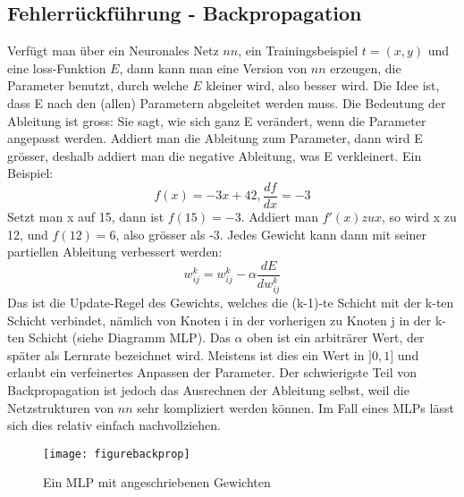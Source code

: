 \documentclass[12pt,a4paper]{article}
\begin{document}
\subsection{Fehlerrückführung - Backpropagation}
Verfügt man über ein Neuronales Netz $nn$, ein Trainingsbeispiel $t = (x,y)$ und eine loss-Funktion $E$, dann kann man eine Version von $nn$ erzeugen, die Parameter benutzt, durch welche $E$ kleiner wird, also besser wird.
Die Idee ist, dass E nach den (allen) Parametern abgeleitet werden muss. Die Bedeutung der Ableitung ist gross: Sie sagt, wie sich ganz E verändert, wenn die Parameter angepasst werden. Addiert man die Ableitung zum Parameter, dann wird E grösser, deshalb addiert man die negative Ableitung, was E verkleinert. Ein Beispiel: 
		$$f(x) = -3x + 42, \frac{df}{dx} = -3$$
Setzt man x auf 15, dann ist $f(15) = -3$. Addiert man $f'(x) zu x$, so wird x zu 12, und $f(12) = 6$, also grösser als -3.
Jedes Gewicht kann dann mit seiner partiellen Ableitung verbessert werden:
	$$w^k_{ij} = w^k_{ij} -  \alpha \frac{dE}{dw^k_{ij}}$$
Das ist die Update-Regel des Gewichts, welches die (k-1)-te Schicht mit der k-ten Schicht verbindet, nämlich von Knoten i in der vorherigen zu Knoten j in der k-ten Schicht (siehe Diagramm MLP). Das $\alpha$ oben ist ein arbiträrer Wert, der später als Lernrate bezeichnet wird. Meistens ist dies ein Wert in $]0,1]$ und erlaubt ein verfeinertes Anpassen der Parameter.
Der schwierigste Teil von Backpropagation ist jedoch das Ausrechnen der Ableitung selbst, weil die Netzstrukturen von $nn$ sehr kompliziert werden können. Im Fall eines MLPs lässt sich dies relativ einfach nachvollziehen.
\begin{figure}[hbt]
\centering
\texttt{[image: figurebackprop]}
\caption{ Ein MLP mit angeschriebenen Gewichten\cite{drawio}}
\end{figure}
\end{document}
